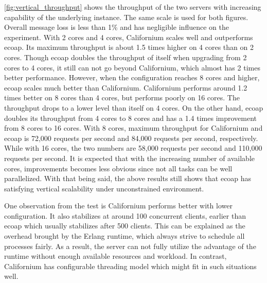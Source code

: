 \autoref{fig:vertical_throughput} shows the throughput of the two servers with increasing capability of the underlying instance. The same scale is used for both figures. Overall message loss is less than 1\% and has negligible influence on the experiment. With 2 cores and 4 cores, Californium scales well and outperforms ecoap. Its maximum throughput is about 1.5 times higher on 4 cores than on 2 cores. Though ecoap doubles the throughput of itself when upgrading from 2 cores to 4 cores, it still can not go beyond Californium, which almost has 2 times better performance. However, when the configuration reaches 8 cores and higher, ecoap scales much better than Californium. Californium performs around 1.2 times better on 8 cores than 4 cores, but performs poorly on 16 cores. The throughput drops to a lower level than itself on 4 cores. On the other hand,  ecoap doubles its throughput from 4 cores to 8 cores and has a 1.4 times improvement from 8 cores to 16 cores. With 8 cores, maximum throughput for Californium and ecoap is 72,000 requests per second and 84,000 requests per second, respectively. While with 16 cores, the two numbers are 58,000 requests per second and 110,000 requests per second. It is expected that with the increasing number of available cores, improvements becomes less obvious since not all tasks can be well parallelized. With that being said, the above results still shows that ecoap has satisfying vertical scalability under unconstrained environment. 

One observation from the test is Californium performs better with lower configuration. It also stabilizes at around 100 concurrent clients, earlier than ecoap which usually stabilizes after 500 clients. This can be explained as the overhead brought by the Erlang runtime, which always strive to schedule all processes fairly. As a result, the server can not fully utilize the advantage of the runtime without enough available resources and workload. In contrast, Californium has configurable threading model which might fit in such situations well.

